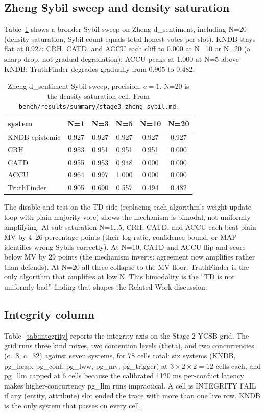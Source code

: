 \documentclass[sigconf, nonacm]{acmart}
\begin{document}
\subsection{Zheng Sybil sweep and density saturation}
Table~\ref{tab:zheng-sybil} shows a broader Sybil sweep on Zheng d\_sentiment, including N=20 (density saturation, Sybil count equals total honest votes per slot). KNDB stays flat at 0.927; CRH, CATD, and ACCU each cliff to 0.000 at N=10 or N=20 (a sharp drop, not gradual degradation); ACCU peaks at 1.000 at N=5 above KNDB; TruthFinder degrades gradually from 0.905 to 0.482.

\begin{table}[t]
\centering
\caption{Zheng d\_sentiment Sybil sweep, precision, $c=1$. N=20 is the density-saturation cell. From \texttt{bench/results/summary/stage3\_zheng\_sybil.md}.}
\label{tab:zheng-sybil}
\small
\begin{tabular}{lccccc}
\toprule
system & N=1 & N=3 & N=5 & N=10 & N=20 \\
\midrule
KNDB epistemic & 0.927 & 0.927 & 0.927 & 0.927 & 0.927 \\
CRH            & 0.953 & 0.951 & 0.951 & 0.951 & 0.000 \\
CATD           & 0.955 & 0.953 & 0.948 & 0.000 & 0.000 \\
ACCU           & 0.964 & 0.997 & 1.000 & 0.000 & 0.000 \\
TruthFinder    & 0.905 & 0.690 & 0.557 & 0.494 & 0.482 \\
\bottomrule
\end{tabular}
\end{table}

The disable-and-test on the TD side (replacing each algorithm's weight-update loop with plain majority vote) shows the mechanism is bimodal, not uniformly amplifying. At sub-saturation N=1\ldots 5, CRH, CATD, and ACCU each beat plain MV by 4--26 percentage points (their log-ratio, confidence bound, or MAP identifies wrong Sybils correctly). At N=10, CATD and ACCU flip and score below MV by 29 points (the mechanism inverts: agreement now amplifies rather than defends). At N=20 all three collapse to the MV floor. TruthFinder is the only algorithm that amplifies at low N. This bimodality is the ``TD is not uniformly bad'' finding that shapes the Related Work discussion.

\subsection{Integrity column}
Table~\ref{tab:integrity} reports the integrity axis on the Stage-2 YCSB grid. The grid runs three kind mixes, two contention levels (theta), and two concurrencies (c=8, c=32) against seven systems, for 78 cells total: six systems (KNDB, pg\_heap, pg\_conf, pg\_lww, pg\_mv, pg\_trigger) at $3 \times 2 \times 2 = 12$ cells each, and pg\_llm capped at 6 cells because the calibrated 1120 ms per-conflict latency makes higher-concurrency pg\_llm runs impractical. A cell is INTEGRITY FAIL if any (entity, attribute) slot ended the trace with more than one live row. KNDB is the only system that passes on every cell.
\end{document}
